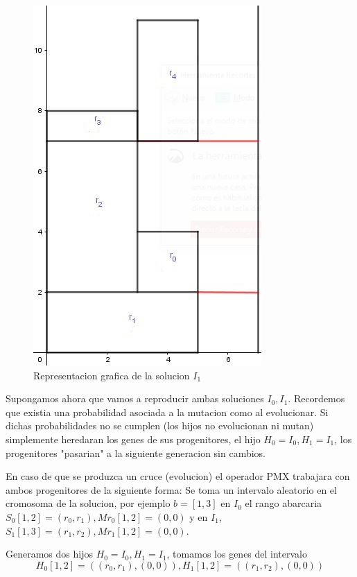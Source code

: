 \documentclass[10pt]{article}
\begin{document}
\begin{figure}[H]
\centerline{\includegraphics[width=0.7\linewidth]{grafica_ejemplo_solucion2_GA.jpg}}
\caption{Representacion grafica de la solucion $I_1$}
\label{fig_2}
\end{figure}

Supongamos ahora que vamos a reproducir ambas soluciones $I_0,I_1$. Recordemos que existia una probabilidad asociada a la mutacion como al evolucionar. Si dichas probabilidades no se cumplen (los hijos no evolucionan ni mutan) simplemente heredaran los genes de sus progenitores, el hijo $H_0 = I_0, H_1 = I_1$, los progenitores "pasarian" a la siguiente generacion sin cambios.

En caso de que se produzca un cruce (evolucion) el operador PMX trabajara con ambos progenitores de la siguiente forma: 
Se toma un intervalo aleatorio en el cromosoma de la solucion, por ejemplo $b = [1,3]$ en $I_0$ el rango abarcaria $S_0[1,2] = (r_0,r_1), Mr_0[1,2] = (0,0)$ y en $I_1$, $S_1[1,3] = (r_1,r_2), Mr_1[1,2] = (0,0)$.

Generamos dos hijos $H_0 = I_0, H_1 = I_1$, tomamos los genes del intervalo
$$H_0[1,2] = ((r_0,r_1),(0,0)), H_1[1,2] = ((r_1,r_2),(0,0))$$
\end{document}
